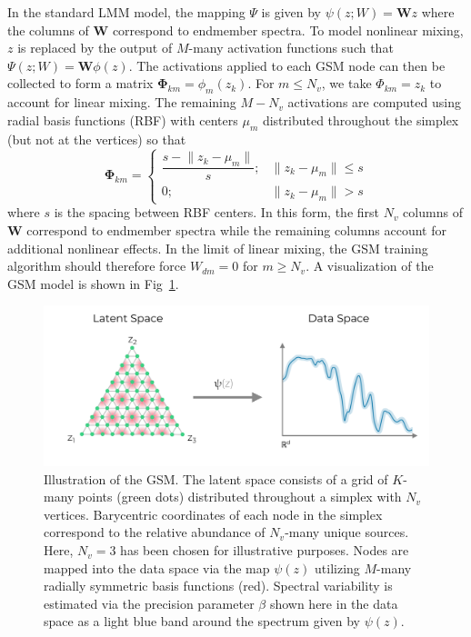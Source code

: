 \documentclass[remotesensing,article,submit,pdftex,moreauthors]{Definitions/mdpi}
\begin{document}
In the standard LMM model, the mapping $\Psi$ is given by $\psi(z;W) = \mathbf{W}z$ where the columns of $\mathbf{W}$ correspond to endmember spectra. To model nonlinear mixing, $z$ is replaced by the output of $M$-many activation functions such that $\Psi(z;W) = \mathbf{W}\phi(z)$. The activations applied to each GSM node can then be collected to form a matrix 
 $\mathbf{\Phi}_{km} = \phi_m(z_k)$. For $m \leq N_v$, we take $\Phi_{km} = z_k$ to account for linear mixing. The remaining  $M-N_v$ activations are computed using radial basis functions (RBF) with centers $\mu_m$ distributed throughout the simplex (but not at the vertices) so that 
\begin{equation}\label{eq:act-function}
    \mathbf{\Phi}_{km} = \begin{cases}
        \dfrac{s - \lVert z_k - \mu_m \rVert}{s}; & \lVert z_k - \mu_m \rVert \leq s \\
        0; & \lVert z_k - \mu_m \rVert > s
    \end{cases}
\end{equation}
where $s$ is the spacing between RBF centers. In this form, the first $N_v$ columns of $\mathbf{W}$ correspond to endmember spectra while the remaining columns account for additional nonlinear effects. In the limit of linear mixing, the GSM training algorithm should therefore force $W_{dm} = 0$ for $m\geq N_v$. A visualization of the GSM model is shown in Fig~\ref{fig:gsm-diagram}.

\begin{figure}[H]
\includegraphics[width=\columnwidth]{methods/gsm/gsm-diagram.pdf}
\caption{Illustration of the GSM. The latent space consists of a grid of $K$-many points (green dots) distributed throughout a simplex with $N_v$ vertices. Barycentric coordinates of each node in the simplex correspond to the relative abundance of $N_v$-many unique sources. Here, $N_v=3$ has been chosen for illustrative purposes. Nodes are mapped into the data space via the map $\psi(z)$ utilizing $M$-many radially symmetric basis functions (red). Spectral variability is estimated via the precision parameter $\beta$ shown here in the data space as a light blue band around the spectrum given by $\psi(z)$.}
\label{fig:gsm-diagram}
\end{figure}  
\end{document}
